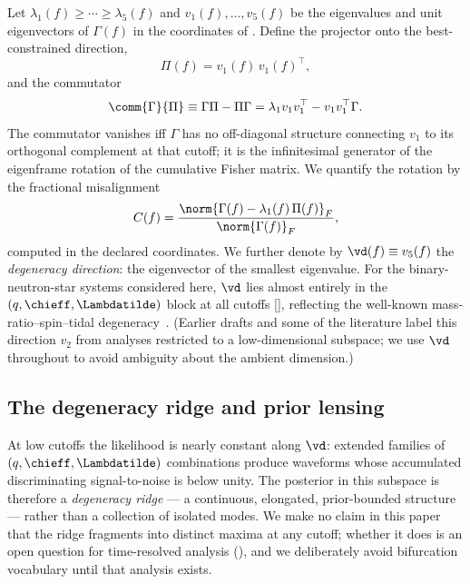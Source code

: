 Let $\lambda_1(f) \ge \cdots \ge \lambda_5(f)$ and $v_1(f), \ldots,
v_5(f)$ be the eigenvalues and unit eigenvectors of $\Gamma(f)$ in the
coordinates of . Define the projector onto the
best-constrained direction,
\begin{equation}
\Pi(f) = v_1(f)\,v_1(f)^{\top},
\label{eq:projector}
\end{equation}
and the commutator
\begin{equation}
\comm{\Gamma}{\Pi} \equiv \Gamma\Pi - \Pi\Gamma
= \lambda_1 v_1 v_1^{\top} - v_1 v_1^{\top}\Gamma .
\label{eq:commutator_def}
\end{equation}
The commutator vanishes iff $\Gamma$ has no off-diagonal structure
connecting $v_1$ to its orthogonal complement at that cutoff; it is the
infinitesimal generator of the eigenframe rotation of the cumulative
Fisher matrix. We quantify the rotation by the fractional misalignment
\begin{equation}
C(f) = \frac{\norm{\Gamma(f) - \lambda_1(f)\,\Pi(f)}_F}
{\norm{\Gamma(f)}_F},
\label{eq:cross_coupling}
\end{equation}
computed in the declared coordinates. We further denote by
$\vd(f) \equiv v_5(f)$ the \emph{degeneracy direction}: the eigenvector
of the smallest eigenvalue. For the binary-neutron-star systems
considered here, $\vd$ lies almost entirely in the
$(q, \chieff, \Lambdatilde)$ block at all cutoffs
[], reflecting
the well-known mass-ratio--spin--tidal degeneracy~{\cite{chatziioannou2020bns}}.
(Earlier drafts and some of the literature label this direction $v_2$
from analyses restricted to a low-dimensional subspace; we use $\vd$
throughout to avoid ambiguity about the ambient dimension.)

\subsection{The degeneracy ridge and prior lensing}
\label{sec:ridge}

At low cutoffs the likelihood  is nearly constant
along $\vd$: extended families of $(q, \chieff, \Lambdatilde)$
combinations produce waveforms whose accumulated discriminating
signal-to-noise  is below unity. The posterior in this
subspace is therefore a \emph{degeneracy ridge} --- a continuous,
elongated, prior-bounded structure --- rather than a collection of
isolated modes. We make no claim in this paper that the ridge fragments
into distinct maxima at any cutoff; whether it does is an open question
for time-resolved analysis (), and we deliberately avoid
bifurcation vocabulary until that analysis exists.

